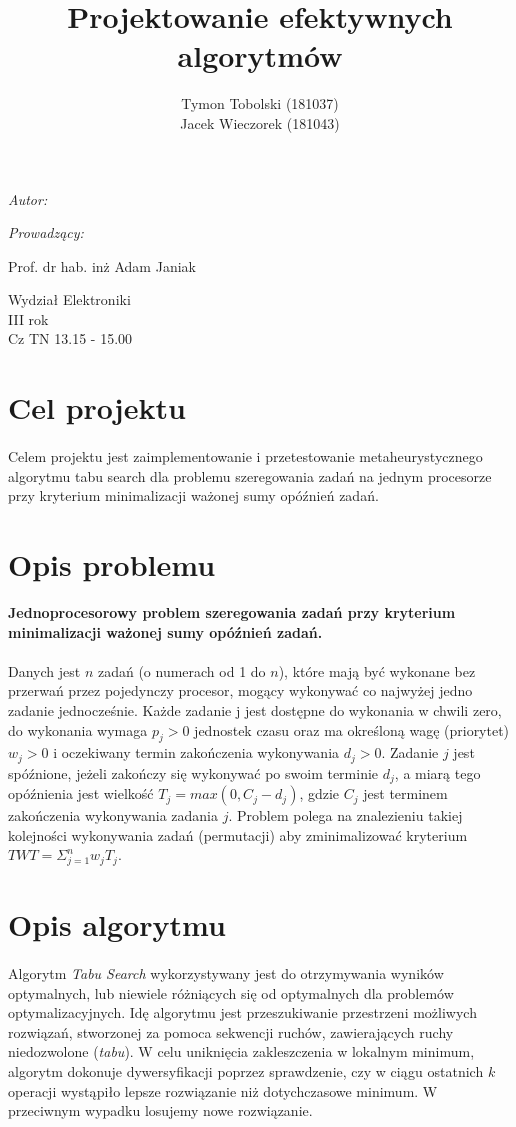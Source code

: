 \documentclass[wide,a4paper,titlepage,12pt] {article}
\title{Projektowanie efektywnych algorytmów}
\author{Tymon Tobolski (181037)\\ Jacek Wieczorek (181043)}
\makeatletter
\renewcommand{\maketitle}{
\begin{titlepage}
  \begin{center}
    \vspace*{3cm}
    \LARGE \@title \par
    \vspace{2cm}
    \textit{\small Autor:}\par
    \normalsize \@author\par \normalsize
    \vspace{3cm}
    \textit{\small Prowadzący:}\par
   Prof. dr hab. inż Adam Janiak \par
    \vspace{2cm}
    Wydział Elektroniki\\ III rok\\ Cz TN 13.15 - 15.00\par
    \vspace{4cm}
    \small \@date
  \end{center}
\end{titlepage}
}
\makeatother
\begin{document}
\maketitle

\section{Cel projektu}
\paragraph{}
  Celem projektu jest zaimplementowanie i przetestowanie metaheurystycznego algorytmu tabu search dla problemu szeregowania zadań na jednym procesorze przy kryterium minimalizacji ważonej sumy opóźnień zadań.

\section{Opis problemu}
{\bf Jednoprocesorowy problem szeregowania zadań przy kryterium
minimalizacji ważonej sumy opóźnień zadań.}

\paragraph{}
Danych jest $n$ zadań (o numerach od 1 do $n$), które mają być wykonane bez przerwań przez pojedynczy procesor, mogący wykonywać co najwyżej jedno zadanie jednocześnie.
Każde zadanie j jest dostępne do wykonania w chwili zero, do wykonania wymaga $p_{j} > 0$ jednostek czasu oraz ma określoną wagę (priorytet) $w_{j} > 0$ i oczekiwany termin zakończenia
wykonywania $d_{j} > 0$. Zadanie $j$ jest spóźnione, jeżeli zakończy się wykonywać po swoim terminie $d_{j}$, a miarą tego opóźnienia jest wielkość $T_{j} = max(0, C_{j} - d_{j} )$, gdzie $C_{j}$ jest terminem zakończenia
wykonywania zadania $j$. Problem polega na znalezieniu takiej kolejności wykonywania zadań (permutacji) aby zminimalizować kryterium $TWT = \Sigma_{j=1}^{n} w_{j} T_{j}$.

\section{Opis algorytmu}
\paragraph{}
Algorytm \textit{Tabu Search} wykorzystywany jest do otrzymywania wyników optymalnych, lub niewiele różniących się od optymalnych dla problemów optymalizacyjnych.
Idę algorytmu jest przeszukiwanie przestrzeni możliwych rozwiązań, stworzonej za pomoca sekwencji ruchów, zawierających ruchy niedozwolone (\textit{tabu}). W celu uniknięcia zakleszczenia w lokalnym minimum, algorytm dokonuje dywersyfikacji poprzez sprawdzenie, czy w ciągu ostatnich $k$ operacji wystąpiło lepsze rozwiązanie niż dotychczasowe minimum. W przeciwnym wypadku losujemy nowe rozwiązanie.
\end{document}
